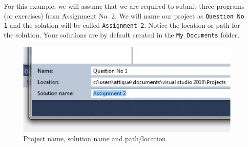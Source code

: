 \documentclass{article}
\begin{document}
For this example, we will assume that we are required to submit three programs (or exercises) from Assignment No. 2. We will name our project as \verb|Question No 1| and the solution will be called \verb|Assignment 2|. Notice the location or path for the solution. Your solutions are by default created in the \verb|My Documents| folder.
\begin{figure}[H]
\centering
\includegraphics[width=\textwidth]{Naming_Solution_Project.png}
\caption{Project name, solution name and path/location}
\end{figure}
\end{document}
